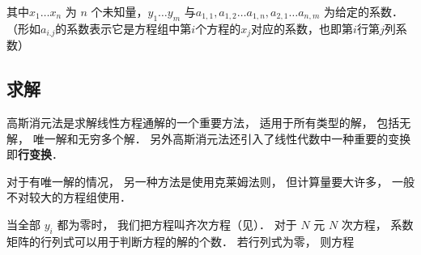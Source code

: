 其中$x_1\dots x_n$ 为 $n$ 个未知量，$y_1\dots y_m$ 与$a_{1,1} ,a_{1,2}\dots a_{1,n},a_{2,1} \dots a_{n,m}$ 为给定的系数．（形如$a_{i.j}$的系数表示它是方程组中第$i$个方程的$x_j$对应的系数，也即第$i$行第$j$列系数）

\subsection{求解}
高斯消元法是求解线性方程通解的一个重要方法， 适用于所有类型的解， 包括无解， 唯一解和无穷多个解． 另外高斯消元法还引入了线性代数中一种重要的变换即\textbf{行变换}．

对于有唯一解的情况， 另一种方法是使用克莱姆法则， 但计算量要大许多， 一般不对较大的方程组使用．

当全部 $y_i$ 都为零时， 我们把方程叫齐次方程（见）． 对于 $N$ 元 $N$ 次方程， 系数矩阵的行列式可以用于判断方程的解的个数． 若行列式为零， 则方程
